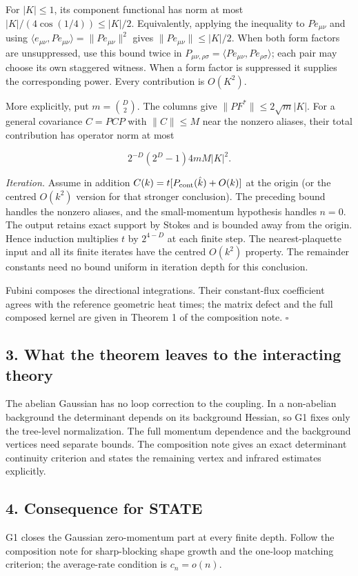 \documentclass[11pt,a4paper]{article}
\begin{document}
For \(|K|\le1\), its component functional has norm at most
\(|K|/(4\cos(1/4))\le |K|/2\). Equivalently, applying the inequality to
\(Pe_{\mu\nu}\) and using
\(\langle e_{\mu\nu},Pe_{\mu\nu}\rangle=\|Pe_{\mu\nu}\|^2\) gives
\(\|Pe_{\mu\nu}\|\le |K|/2\). When both form factors are unsuppressed,
use this bound twice in
\(P_{\mu\nu,\rho\sigma}=\langle Pe_{\mu\nu},Pe_{\rho\sigma}\rangle\);
each pair may choose its own staggered witness. When a form factor is
suppressed it supplies the corresponding power. Every contribution is
\(O(K^2)\).

More explicitly, put \(m=\binom D2\). The columns give
\(\|PF^*\|\le2\sqrt m|K|\). For a general covariance \(C=PCP\) with
\(\|C\|\le M\) near the nonzero aliases, their total contribution has
operator norm at most

\[2^{-D}(2^D-1)4mM|K|^2.\]

\emph{Iteration.} Assume in addition
\(C(k)=t[P_{\rm cont}(\hat k)+O(k)]\) at the origin (or the centred
\(O(k^2)\) version for that stronger conclusion). The preceding bound
handles the nonzero aliases, and the small-momentum hypothesis handles
\(n=0\). The output retains exact support by Stokes and is bounded away
from the origin. Hence induction multiplies \(t\) by \(2^{4-D}\) at each
finite step. The nearest-plaquette input and all its finite iterates
have the centred \(O(k^2)\) property. The remainder constants need no
bound uniform in iteration depth for this conclusion.

Fubini composes the directional integrations. Their constant-flux
coefficient agrees with the reference geometric heat times; the matrix
defect and the full composed kernel are given in Theorem 1 of the
composition note. \(\square\)

\hypertarget{what-the-theorem-leaves-to-the-interacting-theory}{%
\subsection{3. What the theorem leaves to the interacting
theory}\label{what-the-theorem-leaves-to-the-interacting-theory}}

The abelian Gaussian has no loop correction to the coupling. In a
non-abelian background the determinant depends on its background
Hessian, so G1 fixes only the tree-level normalization. The full
momentum dependence and the background vertices need separate bounds.
The composition note gives an exact determinant continuity criterion and
states the remaining vertex and infrared estimates explicitly.

\hypertarget{consequence-for-state}{%
\subsection{4. Consequence for STATE}\label{consequence-for-state}}

G1 closes the Gaussian zero-momentum part at every finite depth. Follow
the composition note for sharp-blocking shape growth and the one-loop
matching criterion; the average-rate condition is \(c_n=o(n)\).
\end{document}
